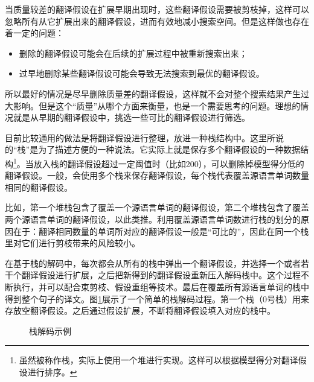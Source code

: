 \parinterval 当质量较差的翻译假设在扩展早期出现时，这些翻译假设需要被剪枝掉，这样可以忽略所有从它扩展出来的翻译假设，进而有效地减小搜索空间。但是这样做也存在着一定的问题：

\begin{itemize}
\vspace{0.5em}
\item 删除的翻译假设可能会在后续的扩展过程中被重新搜索出来；
\vspace{0.5em}
\item 过早地删除某些翻译假设可能会导致无法搜索到最优的翻译假设。
\vspace{0.5em}
\end{itemize}

所以最好的情况是尽早删除质量差的翻译假设，这样就不会对整个搜索结果产生过大影响。但是这个“质量”从哪个方面来衡量，也是一个需要思考的问题。理想的情况就是从早期的翻译假设中，挑选一些可比的翻译假设进行筛选。

\parinterval 目前比较通用的做法是将翻译假设进行整理，放进一种栈结构中。这里所说的“栈”是为了描述方便的一种说法。它实际上就是保存多个翻译假设的一种数据结构\footnote[4]{虽然被称作栈，实际上使用一个堆进行实现。这样可以根据模型得分对翻译假设进行排序。}。当放入栈的翻译假设超过一定阈值时（比如200），可以删除掉模型得分低的翻译假设。一般，会使用多个栈来保存翻译假设，每个栈代表覆盖源语言单词数量相同的翻译假设。

\parinterval 比如，第一个堆栈包含了覆盖一个源语言单词的翻译假设，第二个堆栈包含了覆盖两个源语言单词的翻译假设，以此类推。利用覆盖源语言单词数进行栈的划分的原因在于：翻译相同数量的单词所对应的翻译假设一般是“可比的”，因此在同一个栈里对它们进行剪枝带来的风险较小。

\parinterval 在基于栈的解码中，每次都会从所有的栈中弹出一个翻译假设，并选择一个或者若干个翻译假设进行扩展，之后把新得到的翻译假设重新压入解码栈中。这个过程不断执行，并可以配合束剪枝、假设重组等技术。最后在覆盖所有源语言单词的栈中得到整个句子的译文。图\ref{fig:7-30}展示了一个简单的栈解码过程。第一个栈（0号栈）用来存放空翻译假设。之后通过假设扩展，不断将翻译假设填入对应的栈中。

\begin{figure}[htp]
\centering

\caption{栈解码示例}
\label{fig:7-30}
\end{figure}


